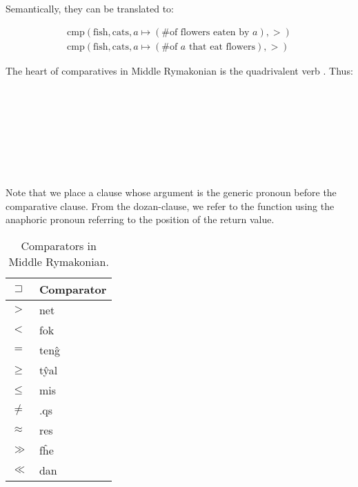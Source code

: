 \documentclass{book}
\newcommand{\lname}{Middle Rymakonian}
\begin{document}
Semantically, they can be translated to:

\begin{gather}
    \text{cmp}(\text{fish}, \text{cats}, a \mapsto (\text{\# of flowers eaten by } a), >) \\
    \text{cmp}(\text{fish}, \text{cats}, a \mapsto (\text{\# of } a \text{ that eat flowers}), >)
\end{gather}

The heart of comparatives in \lname{} is the quadrivalent verb . Thus: \\
~\\
 \\
      \hlvii{$>$} \\
      \\
~\\
 \\
       \hlviii{$>$} \\
      \\

Note that we place a clause whose argument is the generic pronoun before the comparative clause. From the dozan-clause, we refer to the function using the anaphoric pronoun referring to the position of the return value.

\begin{table}[h]
    \caption{Comparators in \lname.}
    \centering
    \begin{tabular}{l|>{\kardinal}l}
        $\sqsupset$ & \textnormal{Comparator} \\
        \hline
        $>$ & net \\
        $<$ & fok \\
        $=$ & ten\^g \\
        $\ge$ & t\^yal \\
        $\le$ & mis \\
        $\ne$ & .qs \\
        $\approx$ & res \\
        $\gg$ & f\^he \\
        $\ll$ & dan \\
    \end{tabular}
\end{table}
\end{document}
